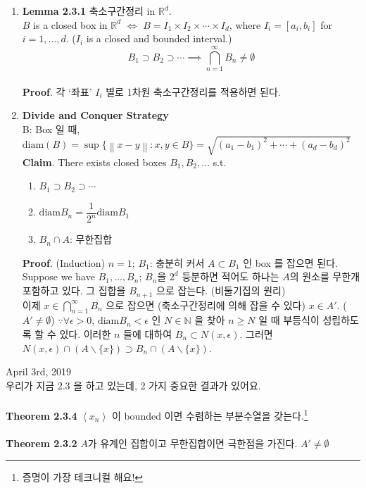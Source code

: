 \documentclass[12pt]{report}
\newcommand{\bb}[1]{\mathbb{#1}}
\newcommand{\norm}[1]{\left\lVert#1\right\rVert}
\renewcommand{\span}[1]{\left\langle #1 \right\rangle}
\newcommand{\imp}{\implies}
\newcommand{\bs}{\backslash}
\newcommand{\diam}{\text{diam}}
\begin{document}
\begin{enumerate}
	\item \textbf{Lemma 2.3.1} 축소구간정리 in $\bb{R}^d$.\\
	$B$ is a closed box in $\bb{R}^d$ $\iff$ $B = I_1\times I_2 \times \cdots \times I_d$, where $I_i = [a_i, b_i]$ for $i = 1, \dots, d$. ($I_i$ is a closed and bounded interval.)\\
	$$B_1\supset B_2\supset \cdots \imp \bigcap_{n=1}^\infty B_n \neq \emptyset$$\\
	\textbf{Proof}. 각 `좌표' $I_i$ 별로 1차원 축소구간정리를 적용하면 된다.
	\item \textbf{Divide and Conquer Strategy}\\
	B: Box 일 때, $\diam(B) = \sup\{\norm{x-y}: x, y\in B \} = \sqrt{(a_1-b_1)^2 + \cdots + (a_d-b_d)^2}$\\
	\textbf{Claim}. There exists closed boxes $B_1, B_2, \dots$ s.t. 
	\begin{enumerate}
		\item $B_1\supset B_2\supset \cdots$
		\item $\diam B_n = \dfrac{1}{2^n}\diam B_1$
		\item $B_n\cap A$: 무한집합
	\end{enumerate}
	\textbf{Proof}. (Induction) $n = 1$; $B_1$: 충분히 커서 $A\subset B_1$ 인 box 를 잡으면 된다.\\
	Suppose we have $B_1, \dots, B_n$; $B_n$을 $2^d$ 등분하면 적어도 하나는 $A$의 원소를 무한개 포함하고 있다. 그 집합을 $B_{n+1}$ 으로 잡는다. (비둘기집의 원리)\\
	이제 $x\in \bigcap_{n=1}^\infty B_n$ 으로 잡으면 (축소구간정리에 의해 잡을 수 있다) $x\in A'$. ($A'\neq \emptyset$)
	$\because \forall \epsilon>0$, $\diam B_n <\epsilon$ 인 $N\in \bb{N}$ 을 찾아 $n\geq N$ 일 때 부등식이 성립하도록 할 수 있다. 이러한 $n$ 들에 대하여 $B_n\subset N(x, \epsilon)$. 그러면 $N(x, \epsilon)\cap (A\bs \{x\}) \supset B_n\cap (A\bs \{x\})$.
\end{enumerate}
\pagebreak
April 3rd, 2019\\
우리가 지금 2.3 을 하고 있는데, 2 가지 중요한 결과가 있어요.\\
\\
\textbf{Theorem 2.3.4} $\span{x_n}$ 이 bounded 이면 수렴하는 부분수열을 갖는다.\footnote{증명이 가장 테크니컬 해요!}\\
\\
\textbf{Theorem 2.3.2} $A$가 유계인 집합이고 무한집합이면 극한점을 가진다. $A'\neq \emptyset$ \\
\end{document}

